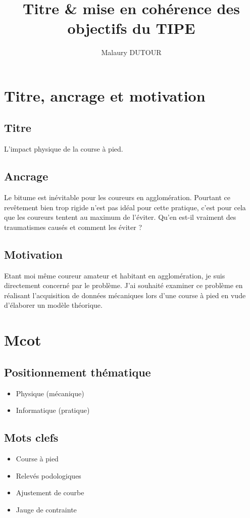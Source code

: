 \documentclass[11pt]{article}
\author{Malaury DUTOUR}
\date{}
\title{Titre \& mise en cohérence des objectifs du TIPE}
\begin{document}
\maketitle

\section{Titre, ancrage et motivation}
\label{sec:org42b7c9c}
\subsection{Titre}
\label{sec:orgd43f1a9}
L'impact physique de la course à pied.\\\empty
\subsection{Ancrage}
\label{sec:org4476db2}
Le bitume est inévitable pour les coureurs en agglomération. Pourtant ce revêtement bien trop rigide n'est pas idéal pour cette pratique, c'est pour cela que les coureurs tentent au maximum de l'éviter. Qu'en est-il vraiment des traumatismes causés et comment les éviter ?\\\empty
\subsection{Motivation}
\label{sec:orgbda5f07}
Etant moi même coureur amateur et habitant en agglomération, je suis directement concerné par le problème. J'ai souhaité examiner ce problème en réalisant l'acquisition de données mécaniques lors d'une course à pied en vude d'élaborer un modèle théorique.\\\empty
\section{Mcot}
\label{sec:orgb4645e8}
\subsection{Positionnement thématique}
\label{sec:org3b48772}
\begin{itemize}
\item Physique (mécanique)\\\empty
\item Informatique (pratique)\\\empty
\end{itemize}
\subsection{Mots clefs}
\label{sec:orgab47563}
\begin{itemize}
\item Course à pied\\\empty
\item Relevés podologiques\\\empty
\item Ajustement de courbe\\\empty
\item Jauge de contrainte\\\empty
\end{itemize}
\end{document}
